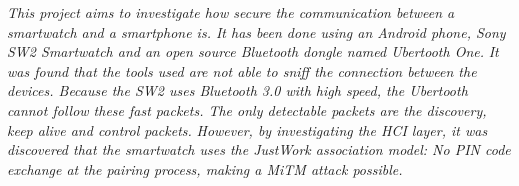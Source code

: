 \textit{This project aims to investigate how secure the communication between a smartwatch and a smartphone is. It has been done using an Android phone, Sony SW2 Smartwatch and an open source Bluetooth dongle named Ubertooth One.}\pend
\textit{It was found that the tools used are not able to sniff the connection between the devices. Because the SW2 uses Bluetooth 3.0 with high speed, the Ubertooth cannot follow these fast packets. The only detectable packets are the discovery, keep alive and control packets.}\pend
\textit{However, by investigating the HCI layer, it was discovered that the smartwatch uses the JustWork association model: No PIN code exchange at the pairing process, making a MiTM attack possible.}\\
